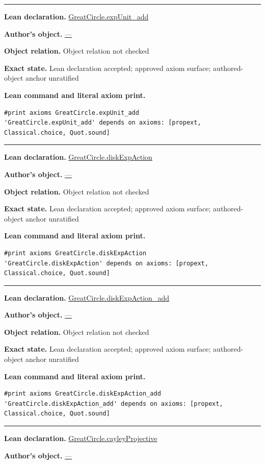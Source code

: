 \documentclass[11pt]{article}
\theoremstyle{plain}
\theoremstyle{definition}
\theoremstyle{remark}
\begin{document}
\begin{tcolorbox}
\begin{Verbatim}[breaklines=true,breakanywhere=true,fontsize=\small]
\end{Verbatim}
\medskip\hrule\medskip
\textbf{Lean declaration.} \url{GreatCircle.expUnit_add}
\par\textbf{Author's object.} \url{—}
\par\textbf{Object relation.} Object relation not checked
\par\textbf{Exact state.} Lean declaration accepted; approved axiom surface; authored-object anchor unratified
\par\smallskip\textbf{Lean command and literal axiom print.}
\begin{Verbatim}[breaklines=true,breakanywhere=true,fontsize=\small]
#print axioms GreatCircle.expUnit_add
'GreatCircle.expUnit_add' depends on axioms: [propext, Classical.choice, Quot.sound]
\end{Verbatim}
\medskip\hrule\medskip
\textbf{Lean declaration.} \url{GreatCircle.diskExpAction}
\par\textbf{Author's object.} \url{—}
\par\textbf{Object relation.} Object relation not checked
\par\textbf{Exact state.} Lean declaration accepted; approved axiom surface; authored-object anchor unratified
\par\smallskip\textbf{Lean command and literal axiom print.}
\begin{Verbatim}[breaklines=true,breakanywhere=true,fontsize=\small]
#print axioms GreatCircle.diskExpAction
'GreatCircle.diskExpAction' depends on axioms: [propext, Classical.choice, Quot.sound]
\end{Verbatim}
\medskip\hrule\medskip
\textbf{Lean declaration.} \url{GreatCircle.diskExpAction_add}
\par\textbf{Author's object.} \url{—}
\par\textbf{Object relation.} Object relation not checked
\par\textbf{Exact state.} Lean declaration accepted; approved axiom surface; authored-object anchor unratified
\par\smallskip\textbf{Lean command and literal axiom print.}
\begin{Verbatim}[breaklines=true,breakanywhere=true,fontsize=\small]
#print axioms GreatCircle.diskExpAction_add
'GreatCircle.diskExpAction_add' depends on axioms: [propext, Classical.choice, Quot.sound]
\end{Verbatim}
\medskip\hrule\medskip
\textbf{Lean declaration.} \url{GreatCircle.cayleyProjective}
\par\textbf{Author's object.} \url{—}

\end{tcolorbox}
\end{document}
